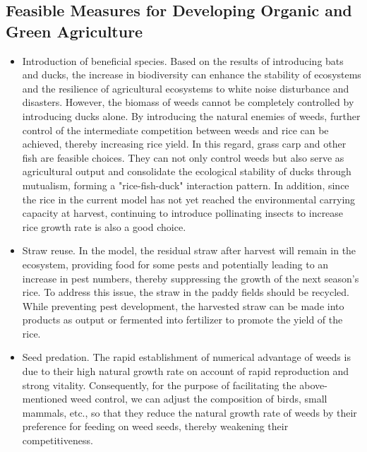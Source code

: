 \documentclass{HZNUMCM}
\begin{document}
      \subsection{Feasible Measures for Developing Organic and Green Agriculture}
        \begin{itemize}
          \item Introduction of beneficial species. 
          Based on the results of introducing bats and ducks, 
          the increase in biodiversity can enhance the stability of ecosystems and the resilience of agricultural ecosystems to white noise disturbance and disasters. 
          However, the biomass of weeds cannot be completely controlled by introducing ducks alone. By introducing the natural enemies of weeds, 
          further control of the intermediate competition between weeds and rice can be achieved, thereby increasing rice yield. 
          In this regard, grass carp and other fish are feasible choices. 
          They can not only control weeds but also serve as agricultural output and consolidate the ecological stability of ducks through mutualism, 
          forming a "rice-fish-duck" interaction pattern. 
          In addition, since the rice in the current model has not yet reached the environmental carrying capacity at harvest, 
          continuing to introduce pollinating insects to increase rice growth rate is also a good choice.
          \item Straw reuse. In the model, the residual straw after harvest will remain in the ecosystem, 
          providing food for some pests and potentially leading to an increase in pest numbers, 
          thereby suppressing the growth of the next season's rice. 
          To address this issue, the straw in the paddy fields should be recycled. 
          While preventing pest development, 
          the harvested straw can be made into products as output or fermented into fertilizer to promote the yield of the rice.
          \item Seed predation. 
          The rapid establishment of numerical advantage of weeds is due to their high natural growth rate on account of rapid reproduction and strong vitality. 
          Consequently, for the purpose of facilitating the above-mentioned weed control, 
          we can adjust the composition of birds, small mammals, etc., 
          so that they reduce the natural growth rate of weeds by their preference for feeding on weed seeds, 
          thereby weakening their competitiveness.
        \end{itemize}
\end{document}

